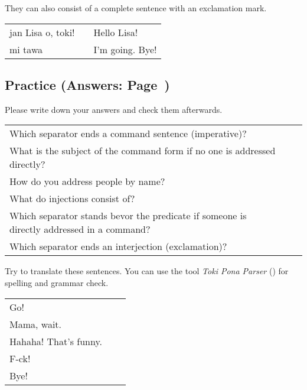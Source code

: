 They can also consist of a complete sentence with an exclamation mark.

\begin{supertabular}{p{5,5cm}|ll}
    jan Lisa o, toki! &  & Hello Lisa!     \\
    mi tawa           &  & I'm going. Bye! \\
\end{supertabular}

%
%
%
%
\newpage
%
\subsection*{Practice (Answers: Page~\pageref{'commands_interjections'})}
%
Please write down your answers and check them afterwards.

\begin{supertabular}{p{5,5cm}|ll}
    Which separator ends a command sentence (imperative)?                                      &  & \\ %
    What is the subject of the command form if no one is addressed directly?                   &  & \\ %
    How do you address people by name?                                                         &  & \\ %
    What do injections consist of?                                                             &  & \\ %
    Which separator stands bevor  the predicate if someone is directly addressed in a command? &  & \\ %
    Which separator ends an interjection (exclamation)?                                        &  & \\ %
\end{supertabular}

Try to translate these sentences.
You can use the tool \textit{Toki Pona Parser} (\cite{www:rowa:02}) for spelling and grammar check.

\begin{supertabular}{p{5,5cm}|ll}
    Go!                   &  & \\ %
    Mama, wait.           &  & \\ %
    Hahaha! That's funny. &  & \\ %
    F-ck!                 &  & \\ %
    Bye!                  &  & \\ %
\end{supertabular}

